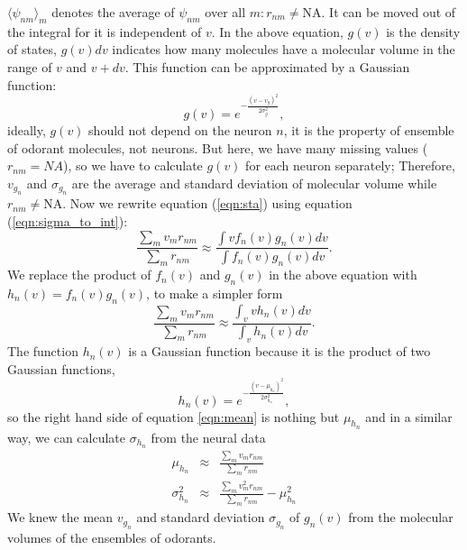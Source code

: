 \documentclass[a1paper,fontscale=0.6]{baposter} %
\begin{document}
\begin{poster}
{$\langle \psi_{nm} \rangle_m$ denotes the average of $\psi_{nm}$ over all $m: r_{nm} \neq \text{NA}$. 
It can be moved out of the integral for it is independent of $v$.
In the above equation, 
$g(v)$ is the density of states, $g(v) dv$ indicates how many molecules have a molecular volume in the range of $v$ and $v+dv$.
This function can be approximated by a Gaussian function:  
\begin{equation}
	g(v) = e^{-\frac{(v- v_{g})^2}{2 \sigma_{g}^2}},
	\label{eqn:hist-volumes}
\end{equation}
ideally, $g(v)$ should not depend on the neuron $n$, 
it is the property of ensemble of odorant molecules, not neurons. 
But here, we have many missing values ($r_{nm} = NA$), 
so we have to calculate $g(v)$ for each neuron separately; 
Therefore, $v_{g_n}$ and $\sigma_{g_n}$ are the average and standard deviation of molecular volume while $r_{nm} \neq \text{NA}$.
Now we rewrite equation (\ref{eqn:sta}) using equation (\ref{eqn:sigma_to_int}):
\begin{equation}
	\frac{\displaystyle \sum_{m} v_m r_{nm}}{\displaystyle \sum_{m} r_{nm}} \approx \frac{\displaystyle \int v f_n(v) g_n(v) dv}{\displaystyle \int f_n(v) g_n(v) dv}.
	\label{eqn:sta_int}
\end{equation}
We replace the product of $f_n(v)$ and $g_n(v)$ in the above equation with $h_n(v) = f_n(v) g_n(v)$, to make a simpler form
\begin{equation}
	\frac{\displaystyle \sum_{m} v_m r_{nm}}{\displaystyle \sum_{m} r_{nm}} \approx \frac{\displaystyle \int_v v h_n(v) dv}{ \displaystyle \int_v  h_n(v) dv }.
	\label{eqn:mean}
\end{equation}
The function $h_n(v)$ is a Gaussian function because it is the product of two Gaussian functions, 
\begin{equation}
h_n(v) = e^{-\frac{(v-\mu_{h_n})^2}{2\sigma_{h_n}^2}}, 
\end{equation}
so the right hand side of equation \ref{eqn:mean} is nothing but $\mu_{h_n}$ and 
in a similar way, we can calculate $\sigma_{h_n}$ from the neural data
\begin{eqnarray}
	\mu_{h_n} &\approx& \frac{\displaystyle \sum_{m} v_m r_{nm}}{\displaystyle \sum_{m} r_{nm}} \\
	\sigma_{h_n}^2 &\approx& \frac{\displaystyle \sum_{m} v_m^2 r_{nm}}{\displaystyle \sum_{m} r_{nm}} - \mu_{h_n}^2
	\label{eqn:final_h}
\end{eqnarray}
We knew the mean $v_{g_n}$ and standard deviation $\sigma_{g_n}$ of $g_n(v)$ from the molecular volumes of the ensembles of odorants. 
}
\end{poster}
\end{document}
